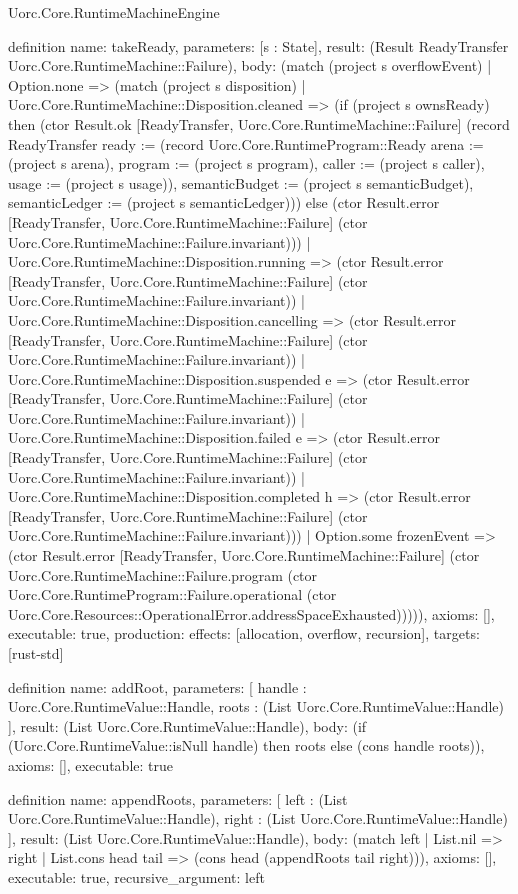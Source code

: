 \begin{lexlean}{Uorc.Core.RuntimeMachineEngine}
\begin{semanticmodule}
definition{
  name: takeReady,
  parameters: [s : State],
  result: (Result ReadyTransfer Uorc.Core.RuntimeMachine::Failure),
  body: (match (project s overflowEvent)
    | Option.none => (match (project s disposition)
      | Uorc.Core.RuntimeMachine::Disposition.cleaned => (if (project s ownsReady) then (ctor Result.ok [ReadyTransfer, Uorc.Core.RuntimeMachine::Failure] (record ReadyTransfer {ready := (record Uorc.Core.RuntimeProgram::Ready {arena := (project s arena), program := (project s program), caller := (project s caller), usage := (project s usage)}), semanticBudget := (project s semanticBudget), semanticLedger := (project s semanticLedger)})) else (ctor Result.error [ReadyTransfer, Uorc.Core.RuntimeMachine::Failure] (ctor Uorc.Core.RuntimeMachine::Failure.invariant)))
      | Uorc.Core.RuntimeMachine::Disposition.running => (ctor Result.error [ReadyTransfer, Uorc.Core.RuntimeMachine::Failure] (ctor Uorc.Core.RuntimeMachine::Failure.invariant))
      | Uorc.Core.RuntimeMachine::Disposition.cancelling => (ctor Result.error [ReadyTransfer, Uorc.Core.RuntimeMachine::Failure] (ctor Uorc.Core.RuntimeMachine::Failure.invariant))
      | Uorc.Core.RuntimeMachine::Disposition.suspended e => (ctor Result.error [ReadyTransfer, Uorc.Core.RuntimeMachine::Failure] (ctor Uorc.Core.RuntimeMachine::Failure.invariant))
      | Uorc.Core.RuntimeMachine::Disposition.failed e => (ctor Result.error [ReadyTransfer, Uorc.Core.RuntimeMachine::Failure] (ctor Uorc.Core.RuntimeMachine::Failure.invariant))
      | Uorc.Core.RuntimeMachine::Disposition.completed h => (ctor Result.error [ReadyTransfer, Uorc.Core.RuntimeMachine::Failure] (ctor Uorc.Core.RuntimeMachine::Failure.invariant)))
    | Option.some frozenEvent => (ctor Result.error [ReadyTransfer, Uorc.Core.RuntimeMachine::Failure] (ctor Uorc.Core.RuntimeMachine::Failure.program (ctor Uorc.Core.RuntimeProgram::Failure.operational (ctor Uorc.Core.Resources::OperationalError.addressSpaceExhausted))))),
  axioms: [],
  executable: true,
  production: {effects: [allocation, overflow, recursion], targets: [rust-std]}
}

definition{
  name: addRoot,
  parameters: [
    handle : Uorc.Core.RuntimeValue::Handle,
    roots : (List Uorc.Core.RuntimeValue::Handle)
  ],
  result: (List Uorc.Core.RuntimeValue::Handle),
  body: (if (Uorc.Core.RuntimeValue::isNull handle) then roots else (cons handle roots)),
  axioms: [],
  executable: true
}

definition{
  name: appendRoots,
  parameters: [
    left : (List Uorc.Core.RuntimeValue::Handle),
    right : (List Uorc.Core.RuntimeValue::Handle)
  ],
  result: (List Uorc.Core.RuntimeValue::Handle),
  body: (match left
    | List.nil => right
    | List.cons head tail => (cons head (appendRoots tail right))),
  axioms: [],
  executable: true,
  recursive_argument: left
}


\end{semanticmodule}
\end{lexlean}
